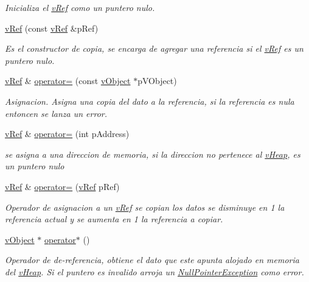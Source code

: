 \begin{DoxyCompactItemize}
\begin{DoxyCompactList}\small\item\em Inicializa el \hyperlink{classv_ref}{v\-Ref} como un puntero nulo. \end{DoxyCompactList}\item 
\hyperlink{classv_ref_a665fe2849fbbabcb1930128b78c144ff}{v\-Ref} (const \hyperlink{classv_ref}{v\-Ref} \&p\-Ref)
\begin{DoxyCompactList}\small\item\em Es el constructor de copia, se encarga de agregar una referencia si el \hyperlink{classv_ref}{v\-Ref} es un puntero nulo. \end{DoxyCompactList}\item 
\hyperlink{classv_ref}{v\-Ref} \& \hyperlink{classv_ref_a6fdd2c2154bfe2a436684b0a4d8dc44c}{operator=} (const \hyperlink{classv_object}{v\-Object} $\ast$p\-V\-Object)
\begin{DoxyCompactList}\small\item\em Asignacion. Asigna una copia del dato a la referencia, si la referencia es nula entoncen se lanza un error. \end{DoxyCompactList}\item 
\hyperlink{classv_ref}{v\-Ref} \& \hyperlink{classv_ref_a09a2b66a31121f2ea39db1d2275df018}{operator=} (int p\-Address)
\begin{DoxyCompactList}\small\item\em se asigna a una direccion de memoria, si la direccion no pertenece al \hyperlink{classv_heap}{v\-Heap}, es un puntero nulo \end{DoxyCompactList}\item 
\hyperlink{classv_ref}{v\-Ref} \& \hyperlink{classv_ref_a7a5795eb3d07af12a724006868ed28ba}{operator=} (\hyperlink{classv_ref}{v\-Ref} p\-Ref)
\begin{DoxyCompactList}\small\item\em Operador de asignacion a un \hyperlink{classv_ref}{v\-Ref} se copian los datos se disminuye en 1 la referencia actual y se aumenta en 1 la referencia a copiar. \end{DoxyCompactList}\item 
\hyperlink{classv_object}{v\-Object} $\ast$ \hyperlink{classv_ref_a8c6c503ee26c2e26bbf336166992f79c}{operator$\ast$} ()
\begin{DoxyCompactList}\small\item\em Operador de de-\/referencia, obtiene el dato que este apunta alojado en memoria del \hyperlink{classv_heap}{v\-Heap}. Si el puntero es invalido arroja un \hyperlink{class_null_pointer_exception}{Null\-Pointer\-Exception} como error. \end{DoxyCompactList}\item 

\end{DoxyCompactItemize}
